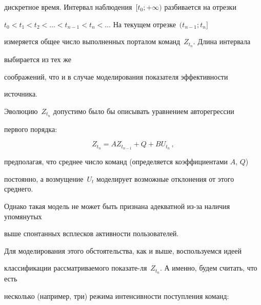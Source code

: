 дискретное время. Интервал наблюдения~$[t_0;+\infty)$ разбивается на отрезки 


$t_0<t_1<t_2<\ldots<t_{n-1}<t_n<\ldots$ На текущем отрезке~$(t_{n-1};t_n]$ 


измеряется общее число выполненных порталом команд~$Z_{t_n}$. Длина интервала 


выбирается из тех же\linebreak\vspace*{-12pt} 


\pagebreak





\noindent


 соображений, что и в случае моделирования показателя эффективности 


источника.


      


      Эволюцию~$Z_{t_n}$ допустимо было бы описывать уравнением авторегрессии 


первого порядка:


      \begin{equation}


      Z_{t_n} =AZ_{t_{n-1}}+Q+BU_{t_n}\,,


      \label{e7-8}


      \end{equation}


предполагая, что среднее число команд (определяется коэффициентами $A$, $Q$) 


постоянно, а возмущение~$U_t$ моделирует возможные отклонения от этого среднего. 


Однако такая модель не может быть признана адекватной из-за наличия упомянутых 


выше спонтанных всплесков активности пользователей.


      


      Для моделирования этого обстоятельства, как и выше, воспользуемся идеей 


классификации рассматриваемого показате-\linebreak ля~$Z_{t_n}$. А именно, будем считать, что есть 


несколько (например, три) режима интенсивности поступления команд:


